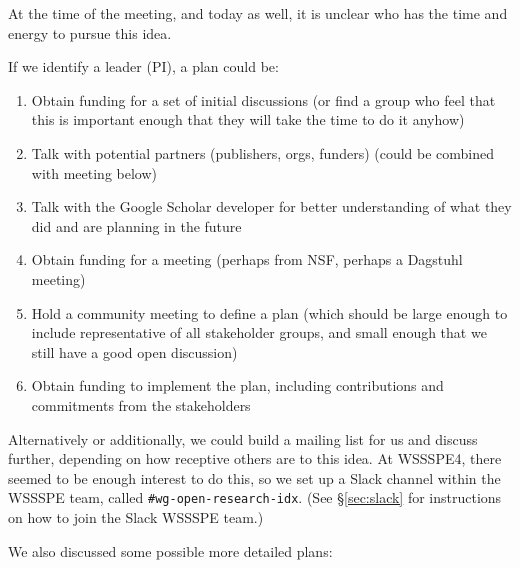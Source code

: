 At the time of the meeting, and today as well, it is unclear who has the time and energy to pursue this idea.

If we identify a leader (PI), a plan could be:
\begin{enumerate}
\item Obtain funding for a set of initial discussions (or find a group who feel that this is important enough that they will take the time to do it anyhow)
\item Talk with potential partners (publishers, orgs, funders) (could be combined with meeting below)
\item Talk with the Google Scholar developer for better understanding of what they did and are planning in the future
\item Obtain funding for a meeting (perhaps from NSF, perhaps a Dagstuhl meeting)
\item Hold a community meeting to define a plan (which should be large enough to include representative of all stakeholder groups, and small enough that we still have a good open discussion)
\item Obtain funding to implement the plan, including contributions and commitments from the stakeholders
\end{enumerate}

Alternatively or additionally, we could build a mailing list for us and discuss further, depending on how receptive others are to this idea.  At WSSSPE4, there seemed to be enough interest to do this, so we set up a Slack channel within the WSSSPE team, called \texttt{\#wg-open-research-idx}. (See \S\ref{sec:slack} for instructions on how to join the Slack WSSSPE team.)

We also discussed some possible more detailed plans:

